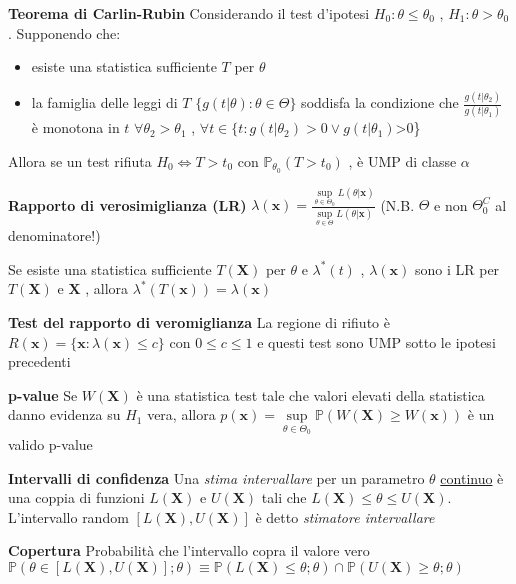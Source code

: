 \documentclass[openany]{book} %
\begin{document}
\textbf{Teorema di Carlin-Rubin} Considerando il test d'ipotesi $H_0:\theta\leq\theta_0$ , $H_1: \theta>\theta_0$. Supponendo che:

\begin{itemize}

	\item esiste una statistica sufficiente $T$ per $\theta$

	\item la famiglia delle leggi di $T$ $\{g(t|\theta):\theta\in\Theta\}$ soddisfa la condizione che $\frac{g(t|\theta_2)}{g(t|\theta_1)}$ è monotona in $t$ $\forall\theta_2>\theta_1$ , $\forall t\in \{t:g(t|\theta_2)>0\vee g(t|\theta_1)$>0\}

\end{itemize}

Allora se un test rifiuta $H_0\Leftrightarrow T>t_0$ con $\mathbb{P}_{\theta_0}(T>t_0)$ , è UMP di classe $\alpha$

\textbf{Rapporto di verosimiglianza (LR)} $\lambda(\boldsymbol{x})=\frac{\underset{\theta\in\Theta_0}{\sup}L(\theta|\boldsymbol{x})}{\underset{\theta\in\Theta}{\sup}L(\theta|\boldsymbol{x})}$ (N.B. $\Theta$ e non $\Theta_0^C$ al denominatore!)

Se esiste una statistica sufficiente $T(\boldsymbol{X})$ per $\theta$ e $\lambda^*(t)$ , $\lambda(\boldsymbol{x})$ sono i LR per $T(\boldsymbol{X})$ e $\boldsymbol{X}$ , allora $\lambda^*(T(\boldsymbol{x}))=\lambda(\boldsymbol{x})$

\textbf{Test del rapporto di veromiglianza} La regione di rifiuto è $R(\boldsymbol{x})=\{\boldsymbol{x}:\lambda(\boldsymbol{x})\leq c\}$ con $0\leq c\leq 1$ e questi test sono UMP sotto le ipotesi precedenti

\textbf{p-value} Se $W(\boldsymbol{X})$ è una statistica test tale che valori elevati della statistica danno evidenza su $H_1$ vera, allora $p(\boldsymbol{x})=\underset{\theta\in\Theta_0}{\sup}\mathbb{P}(W(\boldsymbol{X})\geq W(\boldsymbol{x}))$ è un valido p-value

\textbf{Intervalli di confidenza} Una \textit{stima intervallare} per un parametro $\theta$ \underline{continuo} è una coppia di funzioni $L(\boldsymbol{X})$ e $U(\boldsymbol{X})$ tali che $L(\boldsymbol{X})\leq\theta\leq U(\boldsymbol{X})$. L'intervallo random $[L(\boldsymbol{X}),U(\boldsymbol{X})]$ è detto \textit{stimatore intervallare}

\textbf{Copertura} Probabilità che l'intervallo copra il valore vero $\mathbb{P}(\theta\in[L(\boldsymbol{X}),U(\boldsymbol{X})];\theta)\equiv \mathbb{P}(L(\boldsymbol{X})\leq\theta;\theta)\cap\mathbb{P}(U(\boldsymbol{X})\geq\theta;\theta)$
\end{document}
